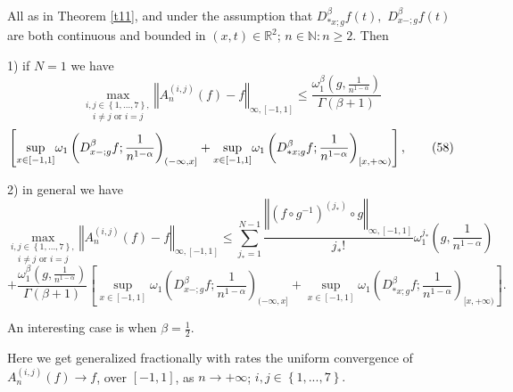 \documentclass[10pt]{NSP1}
\numberwithin{equation}{section}
\begin{document}
\begin{theorem}
\label{t12} All as in Theorem \ref{t11}, and under the assumption that $%
D_{\ast x;g}^{\beta }f\left( t\right) ,$ $D_{x-;g}^{\beta }f\left( t\right) $
are both continuous and bounded in $\left( x,t\right) \in \mathbb{R}^{2}$; $%
n\in \mathbb{N}:n\geq 2$. Then

1) if $N=1$ we have
\begin{equation*}
\underset{i\neq j\text{ or }i=j}{\underset{i,j\in \left \{ 1,...,7\right \} ,%
}{\max }}\left \Vert A_{n}^{\left( i,j\right) }\left( f\right) -f\right
\Vert _{\infty ,\left[ -1,1\right] }\leq \frac{\omega _{1}^{\beta }\left( g,%
\frac{1}{n^{1-\alpha }}\right) }{\Gamma \left( \beta +1\right) }
\end{equation*}
\begin{equation}
\left[ \underset{x\in \left[ -1,1\right] }{\sup }\omega _{1}\left(
D_{x-;g}^{\beta }f;\frac{1}{n^{1-\alpha }}\right) _{(-\infty ,x]}+\underset{%
x\in \left[ -1,1\right] }{\sup }\omega _{1}\left( D_{\ast x;g}^{\beta }f;%
\frac{1}{n^{1-\alpha }}\right) _{[x,+\infty )}\right] ,  \tag{58}  \label{58}
\end{equation}

2) in general we have
\begin{equation}
\underset{i\neq j\text{ or }i=j}{\underset{i,j\in \left \{ 1,...,7\right \} ,%
}{\max }}\left \Vert A_{n}^{\left( i,j\right) }\left( f\right) -f\right
\Vert _{\infty ,\left[ -1,1\right] }\leq \sum_{j_{\ast }=1}^{N-1}\frac{\left
\Vert \left( f\circ g^{-1}\right) ^{\left( j_{\ast }\right) }\circ g\right
\Vert _{\infty ,\left[ -1,1\right] }}{j_{\ast }!}\omega _{1}^{j_{\ast
}}\left( g,\frac{1}{n^{1-\alpha }}\right)  \tag{59}  \label{59}
\end{equation}
\begin{equation*}
+\frac{\omega _{1}^{\beta }\left( g,\frac{1}{n^{1-\alpha }}\right) }{\Gamma
\left( \beta +1\right) }\left[ \underset{x\in \left[ -1,1\right] }{\sup }%
\omega _{1}\left( D_{x-;g}^{\beta }f;\frac{1}{n^{1-\alpha }}\right)
_{(-\infty ,x]}+\underset{x\in \left[ -1,1\right] }{\sup }\omega _{1}\left(
D_{\ast x;g}^{\beta }f;\frac{1}{n^{1-\alpha }}\right) _{[x,+\infty )}\right]
.
\end{equation*}

An interesting case is when $\beta =\frac{1}{2}.$

Here we get generalized fractionally with rates the uniform convergence of $%
A_{n}^{\left( i,j\right) }\left( f\right) \rightarrow f$, over $\left[ -1,1%
\right] $, as $n\rightarrow +\infty $; $i,j\in \left \{ 1,...,7\right \} .$
\end{theorem}
\end{document}
